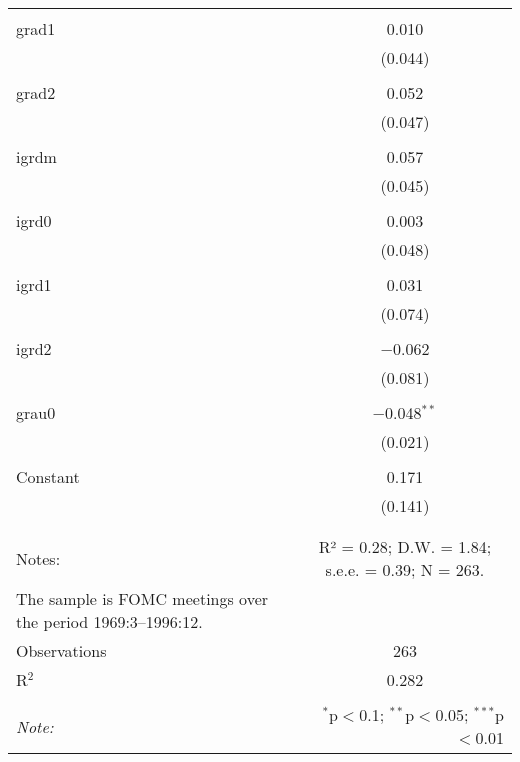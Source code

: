 \begin{table}[!htbp]
\begin{tabular}{@{\extracolsep{5pt}}lc}
  & \\ 
 grad1 & 0.010 \\ 
  & (0.044) \\ 
  & \\ 
 grad2 & 0.052 \\ 
  & (0.047) \\ 
  & \\ 
 igrdm & 0.057 \\ 
  & (0.045) \\ 
  & \\ 
 igrd0 & 0.003 \\ 
  & (0.048) \\ 
  & \\ 
 igrd1 & 0.031 \\ 
  & (0.074) \\ 
  & \\ 
 igrd2 & $-$0.062 \\ 
  & (0.081) \\ 
  & \\ 
 grau0 & $-$0.048$^{**}$ \\ 
  & (0.021) \\ 
  & \\ 
 Constant & 0.171 \\ 
  & (0.141) \\ 
  & \\ 
\hline \\[-1.8ex] 
Notes: & R² = 0.28; D.W. = 1.84; s.e.e. = 0.39; N = 263. \\ 
The sample is FOMC meetings over the period 1969:3–1996:12. &  \\ 
Observations & 263 \\ 
R$^{2}$ & 0.282 \\ 
\hline 
\hline \\[-1.8ex] 
\textit{Note:}  & \multicolumn{1}{r}{$^{*}$p$<$0.1; $^{**}$p$<$0.05; $^{***}$p$<$0.01} \\ 
\end{tabular} 
\end{table} 
